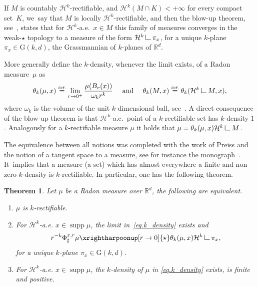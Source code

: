\documentclass[JEP,XML,SOM,Unicode,NoFloatCountersInSection,published]{cedram}
\newenvironment{enumeratei}
{\bgroup\def\theenumi{\roman{enumi}}\def\theenumii{\arabic{enumii}}\begin{enumerate}}
{\end{enumerate}\egroup}
\let\ts\textstyle
\newtheorem{theorem}{Theorem}[section]
\theoremstyle{definition}
\newcommand{\eqdef}{\ensuremath{\stackrel{\mbox{\upshape\tiny def.}}{=}}}
\newcommand\LM[1]{\hbox{\vrule width.5pt \vbox to#1pt{\vfill \hrule width#1pt height.5pt}}}
\newcommand\LL{{\mathchoice {\>\LM7\>}{\>\LM7\>}{\,\LM5\,}{\,\LM{3.35}\,}}}
\newcommand{\mres}{\LL}
\newcommand\cH{\mathcal{H}}
\newcommand{\RR}{\mathbb{R}}
\DeclareMathOperator{\supp}{supp}
\begin{document}
If $M$ is countably $\cH^k$-rectifiable, and $\cH^k(M\cap K)<+\infty$ for every compact set~$K$, we~say that $M$ is locally $\cH^k$-rectifiable, and then the blow-up theorem, see~\cite[Th.\,10.2]{maggi2012sets}, states that for $\cH^k$-a.e.\ $x \in M$ this family of measures converges in the weak-$\star$ topology to a measure of the form $\cH^k \mres \pi_x$, for a unique $k$-plane $\pi_x \in \text{G}(k,d)$, the Grassmannian of $k$-planes of $\RR^d$.

More generally define the $k$-density, whenever the limit exists, of a Radon measure~$\mu$ as
\begin{equation}\label{eq.k_density}
\theta_k(\mu,x) \eqdef \lim_{r \to 0^+}
\frac{\mu(B_r(x))}{\omega_k r^k}\quad \text{ and }\quad
\theta_k(M,x) \eqdef \theta_k(\cH^k\mres M, x),
\end{equation}
where $\omega_k$ is the volume of the unit $k$-dimensional ball, see~\cite{ambrosio2000functions,maggi2012sets}. A direct consequence of the blow-up theorem is that $\cH^k$-a.e.~point of a $k$-rectifiable set has $k$-density $1$. Analogously for a $k$-rectifiable measure $\mu$ it holds that $\mu = \theta_k(\mu, x) \cH^k\mres M$.

The equivalence between all notions was completed with the work of Preiss and the notion of a tangent space to a measure, see for instance the monograph~\cite{delellis2006lecture}. It~implies that a measure (\resp a set) which has almost everywhere a finite and non zero $k$-density is $k$-rectifiable. In particular, one has the following theorem.

\begin{theorem}\label{theorem.rectifiability_tangentiability}
Let $\mu$ be a Radon measure over $\RR^d$, the following are equivalent.
\begin{enumeratei}
\item\label{theorem.rectifiability_tangentiabilityi}
$\mu$ is $k$-rectifiable.
\item\label{theorem.rectifiability_tangentiabilityii}
For $\cH^k$-a.e. $x \in \supp \mu$, the limit in~\eqref{eq.k_density} exists and
\[
r^{-k}\Phi^{x,r}_\sharp \mu \xrightharpoonup[r \to 0]{\ts\star} 
\theta_k(\mu,x)\cH^k\mres \pi_x,
\]
for a unique $k$-plane $\pi_x \in \text{G}(k,d)$.
\item\label{theorem.rectifiability_tangentiabilityiii}
For $\cH^k$-a.e. $x \in \supp \mu$, the $k$-density of $\mu$ in \eqref{eq.k_density} exists, is finite and positive.
\end{enumeratei}
\end{theorem}
\end{document}
